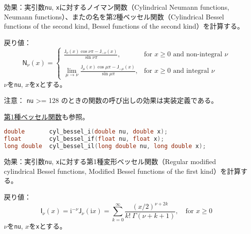 \noindent
\textsf{効果}：実引数\lstinline!nu!,
\lstinline!x!に対するノイマン関数（Cylindrical Neumann functions,
Neumann functions）、またの名を第2種ベッセル関数（Cylindrical Bessel
functions of the second kind, Bessel functions of the second
kind）を計算する。

\noindent
\textsf{戻り値}：
\[
  \mathsf{N}_\nu(x) =
  \left\{
  \begin{array}{cl}
  \displaystyle
  \frac{\mathsf{J}_\nu(x) \cos \nu\pi - \mathsf{J}_{-\nu}(x)}
       {\sin \nu\pi },
  & \mbox{for $x \ge 0$ and non-integral $\nu$}
  \\
  \\
  \displaystyle
  \lim_{\mu \rightarrow \nu} \frac{\mathsf{J}_\mu(x) \cos \mu\pi - \mathsf{J}_{-\mu}(x)}
                                {\sin \mu\pi },
  & \mbox{for $x \ge 0$ and integral $\nu$}
  \end{array}
  \right.
\]
\hspace*{3em}\(\nu\)を\lstinline!nu!, \(x\)を\lstinline!x!とする。

\noindent
\textsf{注意}： \lstinline!nu! \textgreater{}= 128
のときの関数の呼び出しの効果は実装定義である。

\noindent
\hyperref[section8-14]{第1種ベッセル関数}も参照。

%

\bgroup
\begin{lstlisting}[language=C++, aboveskip=0.0zw]
double       cyl_bessel_i(double nu, double x);
float        cyl_bessel_if(float nu, float x);
long double  cyl_bessel_il(long double nu, long double x);
\end{lstlisting}
\egroup

\noindent
\textsf{効果}：実引数\lstinline!nu!,
\lstinline!x!に対する第1種変形ベッセル関数（Regular modified cylindrical
Bessel functions, Modified Bessel functions of the first
kind）を計算する。

\noindent
\textsf{戻り値}：
\[
  \mathsf{I}_\nu(x) =
  \mathrm{i}^{-\nu} \mathsf{J}_\nu(\mathrm{i}x)
  =
  \sum_{k=0}^\infty \frac{(x/2)^{\nu+2k}}
             {k! \: \Gamma(\nu+k+1)},
       \quad \mbox{for $x \ge 0$}
\]
\hspace*{3em}\(\nu\)を\lstinline!nu!, \(x\)を\lstinline!x!とする。


